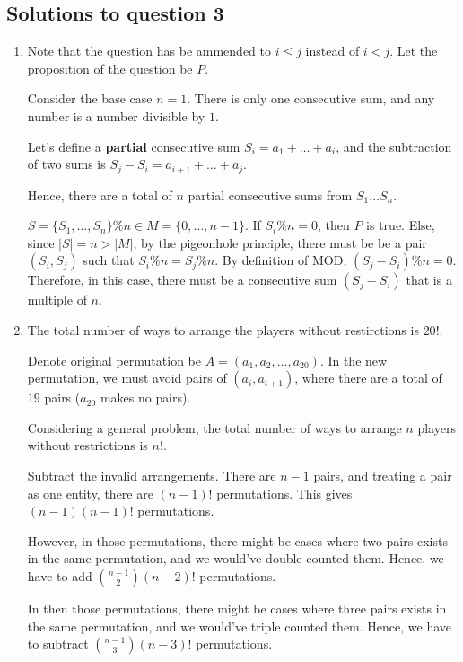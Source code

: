 \documentclass{article}
\begin{document}
\subsection*{Solutions to question 3}
\begin{enumerate}[label=(\alph*)]
    \item Note that the question has be ammended to $i \leq j$ instead of $i < j$. Let the proposition of the question be $P$.

          Consider the base case $n=1$. There is only one consecutive sum, and any number is a number divisible by $1$.

          Let's define a \textbf{partial} consecutive sum $S_i = a_1 + \ldots + a_i$, and the subtraction of two sums is $S_j - S_i = a_{i+1} + \ldots + a_j$.

          Hence, there are a total of $n$ partial consecutive sums from $S_1 \dots S_n$.

          $S=\{S_1,\ldots,S_n\} \% n \in M=\{0,\ldots,n-1\}$. If $S_i \% n = 0$, then $P$ is true. Else, since $|S| = n > |M|$, by the pigeonhole principle, there must be be a pair $(S_i,S_j)$ such that $S_i \% n = S_j \% n$. By definition of MOD, $(S_j - S_i) \% n = 0$. Therefore, in this case, there must be a consecutive sum $(S_j-S_i)$ that is a multiple of $n$.

    \item The total number of ways to arrange the players without restirctions is $20!$.

          Denote original permutation be $A=(a_1,a_2,\ldots,a_{20})$. In the new permutation, we must avoid pairs of $(a_i,a_{i+1})$, where there are a total of $19$ pairs ($a_{20}$ makes no pairs).

          Considering a general problem, the total number of ways to arrange $n$ players without restrictions is $n!$.

          Subtract the invalid arrangements. There are $n-1$ pairs, and treating a pair as one entity, there are $(n-1)!$ permutations. This gives $(n-1)(n-1)!$ permutations.

          However, in those permutations, there might be cases where two pairs exists in the same permutation, and we would've double counted them. Hence, we have to add $\binom{n-1}{2}(n-2)!$ permutations.

          In then those permutations, there might be cases where three pairs exists in the same permutation, and we would've triple counted them. Hence, we have to subtract $\binom{n-1}{3}(n-3)!$ permutations.


\end{enumerate}
\end{document}
